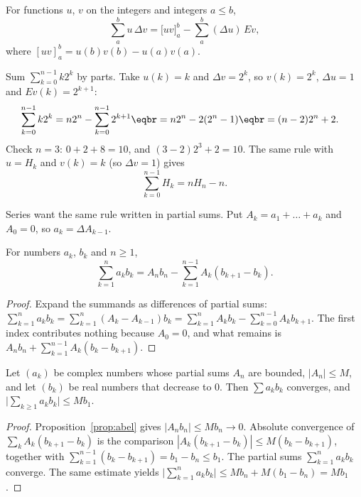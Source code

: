 \begin{proposition}\label{prop:byparts}
For functions $u$, $v$ on the integers and integers $a\le b$,
\[
\sum_a^bu\,\Delta v=\bigl[uv\bigr]_a^b-\sum_a^b(\Delta u)\,Ev,
\]
where $[uv]_a^b=u(b)v(b)-u(a)v(a)$.
\end{proposition}

\begin{example}\label{ex:k2k}
Sum $\sum_{k=0}^{n-1}k2^k$ by parts. Take $u(k)=k$ and $\Delta v=2^k$, so $v(k)=2^k$, $\Delta u=1$ and $Ev(k)=2^{k+1}$:
\[
\begin{aligned}\sum_{k=0}^{n-1}k2^k&=n2^n-\sum_{k=0}^{n-1}2^{k+1}\eqbr=n2^n-2(2^n-1)\eqbr=(n-2)2^n+2.\end{aligned}
\]
Check $n=3$: $0+2+8=10$, and $(3-2)2^3+2=10$. The same rule with $u=H_k$ and $v(k)=k$ (so $\Delta v=1$) gives
\[
\sum_{k=0}^{n-1}H_k=nH_n-n.
\]
\end{example}

Series want the same rule written in partial sums. Put $A_k=a_1+\dots+a_k$ and $A_0=0$, so $a_k=\Delta A_{k-1}$.

\begin{proposition}\label{prop:abel}
For numbers $a_k$, $b_k$ and $n\ge1$,
\[
\sum_{k=1}^na_kb_k=A_nb_n-\sum_{k=1}^{n-1}A_k(b_{k+1}-b_k).
\]
\end{proposition}
\begin{proof}
Expand the summands as differences of partial sums: $\sum_{k=1}^na_kb_k=\sum_{k=1}^n(A_k-A_{k-1})b_k=\sum_{k=1}^nA_kb_k-\sum_{k=0}^{n-1}A_kb_{k+1}$. The first index contributes nothing because $A_0=0$, and what remains is
$A_nb_n+\sum_{k=1}^{n-1}A_k(b_k-b_{k+1})$.
\end{proof}

\begin{theorem}\label{thm:dirichlet}
Let $(a_k)$ be complex numbers whose partial sums $A_n$ are bounded, $|A_n|\le M$, and let $(b_k)$ be real numbers
that decrease to $0$. Then $\sum a_kb_k$ converges, and $\bigl|\sum_{k\ge1}a_kb_k\bigr|\le Mb_1$.
\end{theorem}
\begin{proof}
Proposition~\ref{prop:abel} gives $|A_nb_n|\le Mb_n\to0$. Absolute convergence of $\sum_kA_k(b_{k+1}-b_k)$ is the comparison
$|A_k(b_{k+1}-b_k)|\le M(b_k-b_{k+1})$, together with $\sum_{k=1}^{n-1}(b_k-b_{k+1})=b_1-b_n\le b_1$. The partial sums
$\sum_{k=1}^na_kb_k$ converge. The same estimate yields $\bigl|\sum_{k=1}^na_kb_k\bigr|\le Mb_n+M(b_1-b_n)=Mb_1$.
\end{proof}

